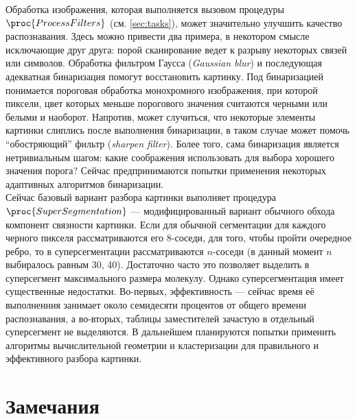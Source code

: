 \noindent
Обработка изображения, которая выполняется вызовом
процедуры $\proc{ProcessFilters}$ (см. \ref{sec:tasks}), может значительно улучшить качество распознавания. Здесь можно привести два примера, в 
некотором смысле исключающие друг друга: 
порой сканирование ведет к разрыву некоторых связей или символов. Обработка фильтром Гаусса (\emph{Gaussian blur}) и последующая адекватная
бинаризация помогут восстановить картинку. Под бинаризацией понимается пороговая обработка монохромного изображения, при которой пиксели, цвет 
которых меньше порогового значения считаются черными или белыми и наоборот. Напротив, может случиться, что некоторые элементы картинки слиплись 
после выполнения бинаризации, в таком случае может помочь ``обостряющий'' фильтр (\emph{sharpen filter}). Более того, сама бинаризация является
нетривиальным шагом: какие соображения использовать для выбора хорошего значения порога? Сейчас предпринимаются попытки применения некоторых 
адаптивных алгоритмов бинаризации. \\

\noindent
Сейчас базовый вариант разбора картинки выполняет процедура $\proc{SuperSegmentation}$ --- модифицированный вариант обычного обхода компонент 
связности картинки. Если для обычной сегментации для каждого черного пикселя рассматриваются его 8-соседи, для того, чтобы пройти очередное ребро, то
в суперсегментации рассматриваются $n$-соседи (в данный момент $n$ выбиралось равным 30, 40). Достаточно часто это позволяет выделить в суперсегмент
максимального размера молекулу. Однако суперсегментация имеет существенные недостатки. Во-первых, эффективность --- сейчас время её выполненния занимает около семидесяти процентов от общего времени распознавания, а во-вторых, таблицы заместителей зачастую в отдельный суперсегмент не выделяются. 
В дальнейшем планируются попытки применить алгоритмы вычислительной геометрии и кластеризации для правильного и эффективного разбора картинки.


\section{Замечания}


